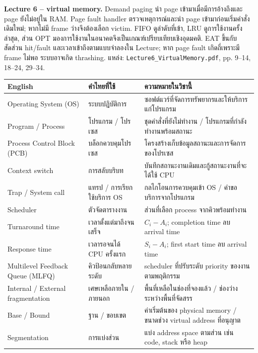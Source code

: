 \noindent\textbf{Lecture 6 -- virtual memory.} Demand paging นำ page เข้ามาเมื่อมีการอ้างถึงและ page ยังไม่อยู่ใน RAM. Page fault handler ตรวจเหตุการณ์และนำ page เข้ามาก่อนเริ่มคำสั่งเดิมใหม่; หากไม่มี frame ว่างจึงต้องเลือก victim. FIFO ดูลำดับที่เข้า, LRU ดูการใช้งานครั้งล่าสุด, ส่วน OPT มองการใช้งานในอนาคตจึงเป็นเกณฑ์เปรียบเทียบเชิงอุดมคติ. EAT ขึ้นกับสัดส่วน hit/fault และเวลาเข้าถึงตามแบบจำลองใน Lecture; หาก page fault เกิดถี่เพราะมี frame ไม่พอ ระบบอาจเกิด thrashing. แหล่ง: \texttt{Lecture6\_VirtualMemory.pdf}, pp. 9--14, 18--24, 29--34.\par\medskip

{\small\begin{center}\renewcommand{\arraystretch}{1.15}
\begin{tabular}{|p{3.5cm}|p{3.6cm}|p{8.1cm}|}\hline
English & คำไทยที่ใช้ & ความหมายในวิชานี้\\\hline
Operating System (OS) & ระบบปฏิบัติการ & ซอฟต์แวร์ที่จัดการทรัพยากรและให้บริการแก่โปรแกรม\\\hline
Program / Process & โปรแกรม / โปรเซส & ชุดคำสั่งที่ยังไม่ทำงาน / โปรแกรมที่กำลังทำงานพร้อมสถานะ\\\hline
Process Control Block (PCB) & บล็อกควบคุมโปรเซส & โครงสร้างเก็บข้อมูลสถานะและการจัดการของโปรเซส\\\hline
Context switch & การสลับบริบท & บันทึกสถานะงานเดิมและกู้สถานะงานที่จะได้ใช้ CPU\\\hline
Trap / System call & แทรป / การเรียกใช้บริการ OS & กลไกโอนการควบคุมเข้า OS / คำขอบริการจากโปรแกรม\\\hline
Scheduler & ตัวจัดตารางงาน & ส่วนที่เลือก process จากคิวพร้อมทำงาน\\\hline
Turnaround time & เวลาตั้งแต่มาถึงจนเสร็จ & $C_i-A_i$; completion time ลบ arrival time\\\hline
Response time & เวลารอจนได้ CPU ครั้งแรก & $S_i-A_i$; first start time ลบ arrival time\\\hline
Multilevel Feedback Queue (MLFQ) & คิวป้อนกลับหลายระดับ & scheduler ที่ปรับระดับ priority ของงานตามพฤติกรรม\\\hline
Internal / External fragmentation & เศษเหลือภายใน / ภายนอก & พื้นที่เหลือในช่องที่จองแล้ว / ช่องว่างระหว่างพื้นที่จัดสรร\\\hline
Base / Bound & ฐาน / ขอบเขต & ค่าเริ่มต้นของ physical memory / ขนาดช่วง virtual address ที่อนุญาต\\\hline
Segmentation & การแบ่งส่วน & แบ่ง address space ตามส่วน เช่น code, stack หรือ heap\\\hline

\end{tabular}
\end{center}}

